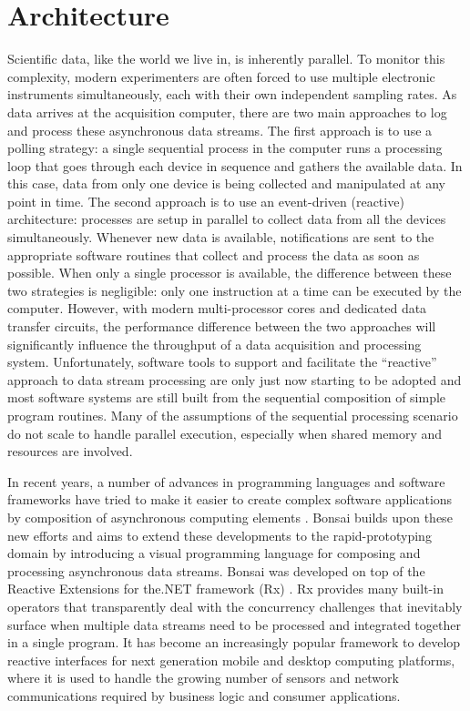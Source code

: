 \section{Architecture}

Scientific data, like the world we live in, is inherently parallel. To monitor this complexity, modern experimenters are often forced to use multiple electronic instruments simultaneously, each with their own independent sampling rates. As data arrives at the acquisition computer, there are two main approaches to log and process these asynchronous data streams. The first approach is to use a polling strategy: a single sequential process in the computer runs a processing loop that goes through each device in sequence and gathers the available data. In this case, data from only one device is being collected and manipulated at any point in time. The second approach is to use an event-driven (reactive) architecture: processes are setup in parallel to collect data from all the devices simultaneously. Whenever new data is available, notifications are sent to the appropriate software routines that collect and process the data as soon as possible. When only a single processor is available, the difference between these two strategies is negligible: only one instruction at a time can be executed by the computer. However, with modern multi-processor cores and dedicated data transfer circuits, the performance difference between the two approaches will significantly influence the throughput of a data acquisition and processing system. Unfortunately, software tools to support and facilitate the “reactive” approach to data stream processing are only just now starting to be adopted and most software systems are still built from the sequential composition of simple program routines. Many of the assumptions of the sequential processing scenario do not scale to handle parallel execution, especially when shared memory and resources are involved.

In recent years, a number of advances in programming languages and software frameworks have tried to make it easier to create complex software applications by composition of asynchronous computing elements \cite{Bainomugisha2013}. Bonsai builds upon these new efforts and aims to extend these developments to the rapid-prototyping domain by introducing a visual programming language for composing and processing asynchronous data streams. Bonsai was developed on top of the Reactive Extensions for the.NET framework (Rx) \cite{MicrosoftOpenTechnologies2014}. Rx provides many built-in operators that transparently deal with the concurrency challenges that inevitably surface when multiple data streams need to be processed and integrated together in a single program. It has become an increasingly popular framework to develop reactive interfaces for next generation mobile and desktop computing platforms, where it is used to handle the growing number of sensors and network communications required by business logic and consumer applications.

